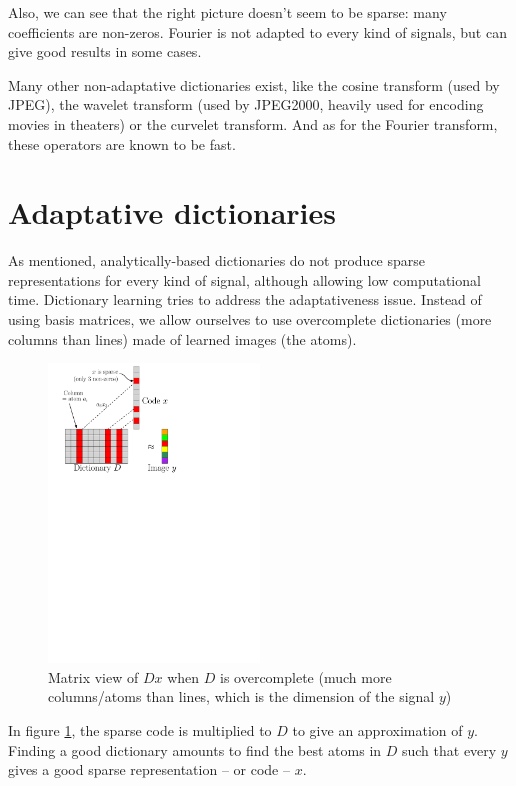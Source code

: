 Also, we can see that the right picture doesn't seem to be sparse: many coefficients are non-zeros. Fourier is not adapted to every kind of signals, but can give good results in some cases.

Many other non-adaptative dictionaries exist, like the cosine transform (used by JPEG), the wavelet transform (used by JPEG2000, heavily used for encoding movies in theaters) or the curvelet transform. And as for the Fourier transform, these operators are known to be fast.

\section{Adaptative dictionaries}
As mentioned, analytically-based dictionaries do not produce sparse representations for every kind of signal, although allowing low computational time. Dictionary learning tries to address the adaptativeness issue. Instead of using basis matrices, we allow ourselves to use overcomplete dictionaries (more columns than lines) made of learned images (the atoms).
\begin{figure}[!h] \centering
\includegraphics[width=0.5\textwidth]{figures/sparsity-matrix.pdf}
\caption{Matrix view of $Dx$ when $D$ is overcomplete (much more columns/atoms than lines, which is the dimension of the signal $y$) \label{fig_overcomplete_matrix}}
\end{figure}
In figure \ref{fig_overcomplete_matrix}, the sparse code is multiplied to $D$ to give an approximation of $y$. Finding a good dictionary amounts to find the best atoms in $D$ such that every $y$ gives a good sparse representation – or code – $x$.

